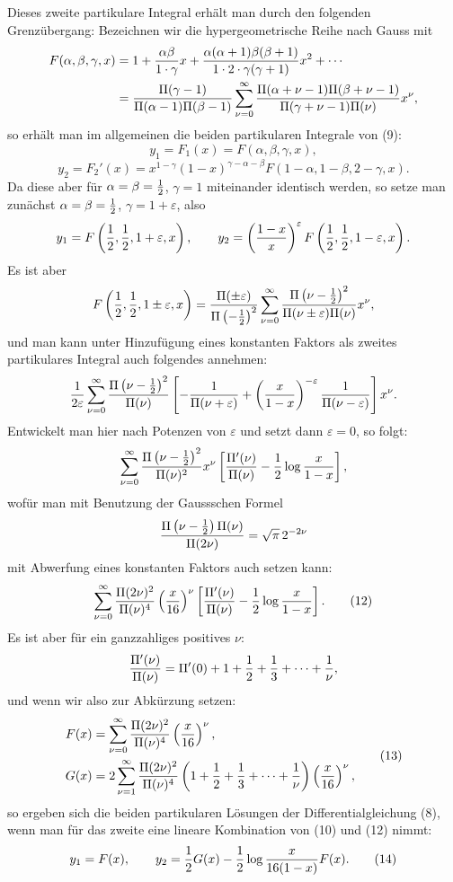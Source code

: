 \documentclass[11pt]{article}
\begin{document}
Dieses zweite partikulare Integral erhält man durch den folgenden Grenzübergang: Bezeichnen wir die hypergeometrische Reihe nach Gauss mit
\[
\begin{aligned}
F(\alpha,\beta,\gamma,x)
&=1+{\alpha\beta\over1\cdot\gamma}x
+{\alpha(\alpha+1)\beta(\beta+1)\over1\cdot2\cdot\gamma(\gamma+1)}x^2+\cdots\\
&={\Pi(\gamma-1)\over\Pi(\alpha-1)\Pi(\beta-1)}
\sum_{\nu=0}^{\infty}{\Pi(\alpha+\nu-1)\Pi(\beta+\nu-1)\over\Pi(\gamma+\nu-1)\Pi(\nu)}x^\nu,
\end{aligned}
\]
so erhält man im allgemeinen die beiden partikularen Integrale von (9):
\[
y_1=F_1(x)=F(\alpha,\beta,\gamma,x),
\]
\[
y_2=F_2'(x)=x^{1-\gamma}(1-x)^{\gamma-\alpha-\beta}F(1-\alpha,1-\beta,2-\gamma,x).
\]
Da diese aber für $\alpha=\beta={1\over2}$, $\gamma=1$ miteinander identisch werden, so setze man zunächst $\alpha=\beta={1\over2}$, $\gamma=1+\varepsilon$, also
\[
y_1=F\left({1\over2},{1\over2},1+\varepsilon,x\right),
\qquad
 y_2=\left({1-x\over x}\right)^{\varepsilon}F\left({1\over2},{1\over2},1-\varepsilon,x\right).
\]
Es ist aber
\[
F\left({1\over2},{1\over2},1\pm\varepsilon,x\right)
={\Pi(\pm\varepsilon)\over\Pi\left(-{1\over2}\right)^2}
\sum_{\nu=0}^{\infty}
{\Pi\left(\nu-{1\over2}\right)^2\over\Pi(\nu\pm\varepsilon)\Pi(\nu)}x^\nu,
\]
und man kann unter Hinzufügung eines konstanten Faktors als zweites partikulares Integral auch folgendes annehmen:
\[
{1\over2\varepsilon}\sum_{\nu=0}^{\infty}{\Pi\left(\nu-{1\over2}\right)^2\over\Pi(\nu)}
\left[-{1\over\Pi(\nu+\varepsilon)}+
\left({x\over1-x}\right)^{-\varepsilon}{1\over\Pi(\nu-\varepsilon)}\right]x^\nu.
\]
Entwickelt man hier nach Potenzen von $\varepsilon$ und setzt dann $\varepsilon=0$, so folgt:
\[
\sum_{\nu=0}^{\infty}{\Pi\left(\nu-{1\over2}\right)^2\over\Pi(\nu)^2}x^\nu
\left[{\Pi'(\nu)\over\Pi(\nu)}-{1\over2}\log{x\over1-x}\right],
\]
wofür man mit Benutzung der Gaussschen Formel
\[
{\Pi\left(\nu-{1\over2}\right)\Pi(\nu)\over\Pi(2\nu)}=\sqrt\pi\,2^{-2\nu}
\]
mit Abwerfung eines konstanten Faktors auch setzen kann:
\begin{equation}
\sum_{\nu=0}^{\infty}{\Pi(2\nu)^2\over\Pi(\nu)^4}\left({x\over16}\right)^\nu
\left[{\Pi'(\nu)\over\Pi(\nu)}-{1\over2}\log{x\over1-x}\right].
\tag{12}
\end{equation}
Es ist aber für ein ganzzahliges positives $\nu$:
\[
{\Pi'(\nu)\over\Pi(\nu)}=\Pi'(0)+1+{1\over2}+{1\over3}+\cdots+{1\over\nu},
\]
und wenn wir also zur Abkürzung setzen:
\begin{equation}
\begin{aligned}
F(x)&=\sum_{\nu=0}^{\infty}{\Pi(2\nu)^2\over\Pi(\nu)^4}\left({x\over16}\right)^\nu,\\
G(x)&=2\sum_{\nu=1}^{\infty}{\Pi(2\nu)^2\over\Pi(\nu)^4}\left(1+{1\over2}+{1\over3}+\cdots+{1\over\nu}\right)\left({x\over16}\right)^\nu,
\end{aligned}
\tag{13}
\end{equation}
so ergeben sich die beiden partikularen Lösungen der Differentialgleichung (8), wenn man für das zweite eine lineare Kombination von (10) und (12) nimmt:
\begin{equation}
y_1=F(x),
\qquad
y_2={1\over2}G(x)-{1\over2}\log{x\over16(1-x)}F(x).
\tag{14}
\end{equation}
\end{document}
